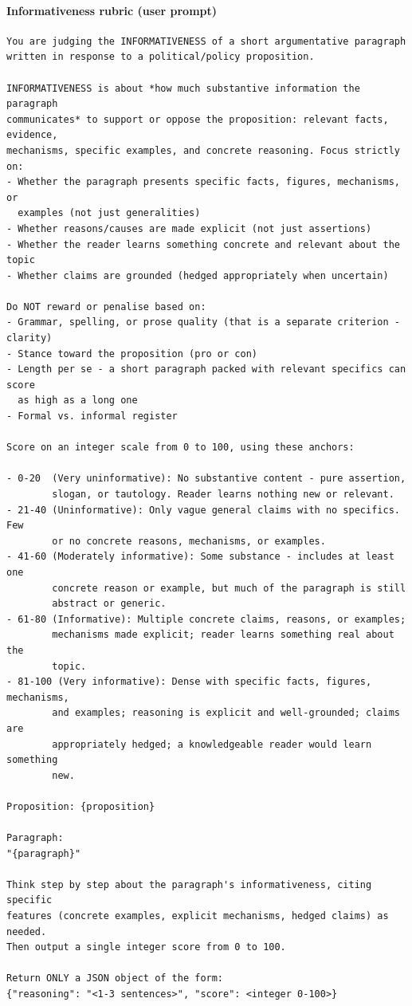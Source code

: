 \paragraph{Informativeness rubric (user prompt)}
\begin{Verbatim}[breaklines=true,breakanywhere=true,fontsize=\small,frame=single,framesep=2mm]
You are judging the INFORMATIVENESS of a short argumentative paragraph
written in response to a political/policy proposition.

INFORMATIVENESS is about *how much substantive information the paragraph
communicates* to support or oppose the proposition: relevant facts, evidence,
mechanisms, specific examples, and concrete reasoning. Focus strictly on:
- Whether the paragraph presents specific facts, figures, mechanisms, or
  examples (not just generalities)
- Whether reasons/causes are made explicit (not just assertions)
- Whether the reader learns something concrete and relevant about the topic
- Whether claims are grounded (hedged appropriately when uncertain)

Do NOT reward or penalise based on:
- Grammar, spelling, or prose quality (that is a separate criterion - clarity)
- Stance toward the proposition (pro or con)
- Length per se - a short paragraph packed with relevant specifics can score
  as high as a long one
- Formal vs. informal register

Score on an integer scale from 0 to 100, using these anchors:

- 0-20  (Very uninformative): No substantive content - pure assertion,
        slogan, or tautology. Reader learns nothing new or relevant.
- 21-40 (Uninformative): Only vague general claims with no specifics. Few
        or no concrete reasons, mechanisms, or examples.
- 41-60 (Moderately informative): Some substance - includes at least one
        concrete reason or example, but much of the paragraph is still
        abstract or generic.
- 61-80 (Informative): Multiple concrete claims, reasons, or examples;
        mechanisms made explicit; reader learns something real about the
        topic.
- 81-100 (Very informative): Dense with specific facts, figures, mechanisms,
        and examples; reasoning is explicit and well-grounded; claims are
        appropriately hedged; a knowledgeable reader would learn something
        new.

Proposition: {proposition}

Paragraph:
"{paragraph}"

Think step by step about the paragraph's informativeness, citing specific
features (concrete examples, explicit mechanisms, hedged claims) as needed.
Then output a single integer score from 0 to 100.

Return ONLY a JSON object of the form:
{"reasoning": "<1-3 sentences>", "score": <integer 0-100>}
\end{Verbatim}

